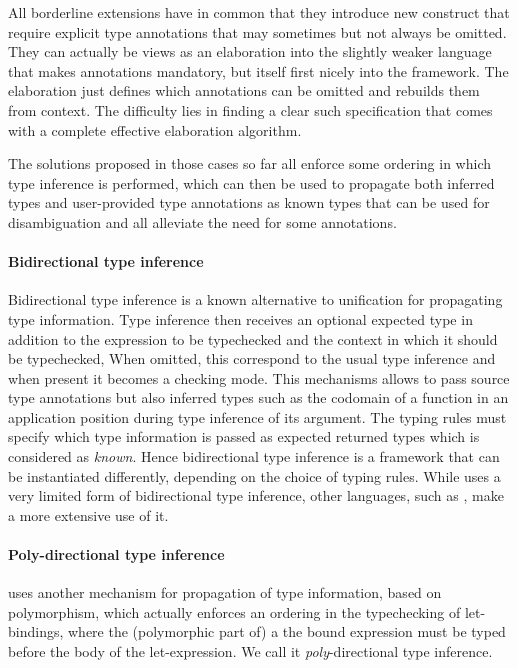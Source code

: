 \documentclass[acmsmall,screen,nonacm]{acmart}
\begin{document}
All borderline extensions have in common that they introduce new construct
that require explicit type annotations that may sometimes but not always be
omitted. They can actually be views as an elaboration into the slightly weaker
language that makes annotations mandatory, but itself first nicely into
the \ML framework. The elaboration just defines which annotations can be
omitted and rebuilds them from context.
%
The difficulty lies in finding a clear such specification that comes with a
complete effective elaboration algorithm.

The solutions proposed in those cases so far all enforce some ordering in
which type inference is performed, which can then be used to propagate both
inferred types and user-provided type annotations as known types that can be
used for disambiguation and all alleviate the need for some annotations.

\paragraph{Bidirectional type inference}

Bidirectional type inference is a known alternative to unification for
propagating type information. Type inference then receives an optional
expected type in addition to the expression to be typechecked and the
context in which it should be typechecked, When omitted, this correspond to
the usual type inference and when present it becomes a checking mode.  This
mechanisms allows to pass source type annotations but also inferred types
such as the codomain of a function in an application position during type
inference of its argument.  The typing rules must specify which type
information is passed as expected returned types which is considered as
\emph{known}.  Hence bidirectional type inference is a framework that can be
instantiated differently, depending on the choice of typing rules.  While
\OCaml uses a very limited form of bidirectional type inference, other
languages, such as \Haskell, make a more extensive use of it.


\paragraph{Poly-directional type inference}

\OCaml uses another mechanism for propagation of type
information, based on polymorphism, which actually enforces an ordering in
the typechecking of let-bindings, where the (polymorphic part of) a the
bound expression must be typed before the body of the let-expression.
We call it \emph{poly}-directional type inference.
\end{document}
